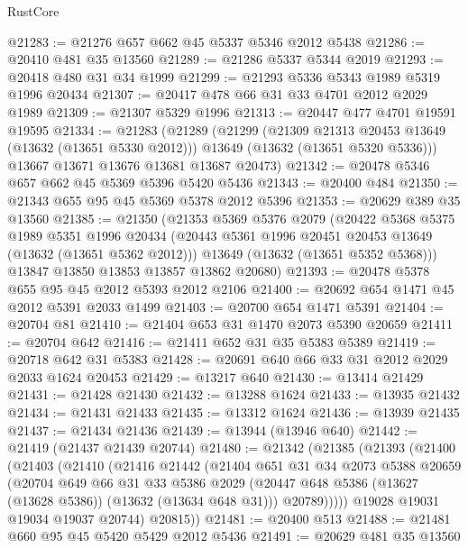 \begin{lexlean}{RustCore}
\begin{coremodule}
@21283 := @21276 @657 @662 @45 @5337 @5346 @2012 @5438
@21286 := @20410 @481 @35 @13560
@21289 := @21286 @5337 @5344 @2019
@21293 := @20418 @480 @31 @34 @1999
@21299 := @21293 @5336 @5343 @1989 @5319 @1996 @20434
@21307 := @20417 @478 @66 @31 @33 @4701 @2012 @2029 @1989
@21309 := @21307 @5329 @1996
@21313 := @20447 @477 @4701 @19591 @19595
@21334 := @21283
    (@21289
      (@21299
        (@21309 @21313 @20453 @13649 (@13632 (@13651 @5330 @2012)))
        @13649
        (@13632 (@13651 @5320 @5336)))
      @13667
      @13671
      @13676
      @13681
      @13687
      @20473)
@21342 := @20478 @5346 @657 @662 @45 @5369 @5396 @5420 @5436
@21343 := @20400 @484
@21350 := @21343 @655 @95 @45 @5369 @5378 @2012 @5396
@21353 := @20629 @389 @35 @13560
@21385 := @21350
    (@21353
      @5369
      @5376
      @2079
      (@20422
        @5368
        @5375
        @1989
        @5351
        @1996
        @20434
        (@20443 @5361 @1996 @20451 @20453 @13649 (@13632 (@13651 @5362 @2012)))
        @13649
        (@13632 (@13651 @5352 @5368)))
      @13847
      @13850
      @13853
      @13857
      @13862
      @20680)
@21393 := @20478 @5378 @655 @95 @45 @2012 @5393 @2012 @2106
@21400 := @20692 @654 @1471 @45 @2012 @5391 @2033 @1499
@21403 := @20700 @654 @1471 @5391
@21404 := @20704 @81
@21410 := @21404 @653 @31 @1470 @2073 @5390 @20659
@21411 := @20704 @642
@21416 := @21411 @652 @31 @35 @5383 @5389
@21419 := @20718 @642 @31 @5383
@21428 := @20691 @640 @66 @33 @31 @2012 @2029 @2033 @1624 @20453
@21429 := @13217 @640
@21430 := @13414 @21429
@21431 := @21428 @21430
@21432 := @13288 @1624
@21433 := @13935 @21432
@21434 := @21431 @21433
@21435 := @13312 @1624
@21436 := @13939 @21435
@21437 := @21434 @21436
@21439 := @13944 (@13946 @640)
@21442 := @21419 (@21437 @21439 @20744)
@21480 := @21342
    (@21385
      (@21393
        (@21400
          (@21403
            (@21410
              (@21416
                @21442
                (@21404
                  @651
                  @31
                  @34
                  @2073
                  @5388
                  @20659
                  (@20704
                    @649
                    @66
                    @31
                    @33
                    @5386
                    @2029
                    (@20447 @648 @5386 (@13627 (@13628 @5386)) (@13632 (@13634 @648 @31)))
                    @20789)))))
          @19028
          @19031
          @19034
          @19037
          @20744)
        @20815))
@21481 := @20400 @513
@21488 := @21481 @660 @95 @45 @5420 @5429 @2012 @5436
@21491 := @20629 @481 @35 @13560

\end{coremodule}
\end{lexlean}
